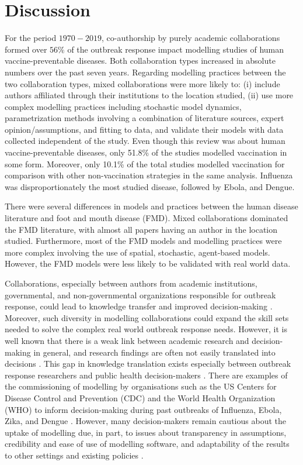 \documentclass[10pt,letterpaper]{article}
\begin{document}
\section*{Discussion}
For the period $1970-2019$, co-authorship by purely academic collaborations formed over $56\%$ of the outbreak response impact modelling studies of human vaccine-preventable diseases. Both collaboration types increased in absolute numbers over the past seven years. Regarding modelling practices between the two collaboration types, mixed collaborations were more likely to: (i) include authors affiliated through their institutions to the location studied, (ii) use more complex modelling practices including stochastic model dynamics, parametrization methods involving a combination of literature sources, expert opinion/assumptions, and fitting to data, and validate their models with data collected independent of the study. Even though this review was about human vaccine-preventable diseases, only 51.8\% of the studies modelled vaccination in some form. Moreover, only 10.1\% of the total studies modelled vaccination for comparison with other non-vaccination strategies in the same analysis. Influenza was disproportionately the most studied disease, followed by Ebola, and Dengue. 

There were several differences in models and practices between the human disease literature and foot and mouth disease (FMD). Mixed collaborations dominated the FMD literature, with almost all papers having an author in the location studied. Furthermore, most of the FMD models and modelling practices were more complex involving the use of spatial, stochastic, agent-based models. However, the FMD models were less likely to be validated with real world data.

Collaborations, especially between authors from academic institutions, governmental, and non-governmental organizations responsible for outbreak response, could lead to knowledge transfer and improved decision-making \cite{Muscatello2017}. Moreover, such diversity in modelling collaborations could expand the skill sets needed to solve the complex real world outbreak response needs. However, it is well known that there is a weak link between academic research and decision-making in general, and research findings are often not easily translated into decisions \cite{Choi2005,Deelstra2003,Muscatello2017}. This gap in knowledge translation exists especially between outbreak response researchers and public health decision-makers \cite{Rivers2019,Muscatello2017}. There are examples of the commissioning of modelling by organisations such as the US Centers for Disease Control and Prevention (CDC) and the World Health Organization (WHO) to inform decision-making during past outbreaks of Influenza, Ebola, Zika, and Dengue \cite{Muscatello2017}. However, many decision-makers remain cautious about the uptake of modelling due, in part, to issues about transparency in assumptions, credibility and ease of use of modelling software, and adaptability of the results to other settings and existing policies \cite{Muscatello2017}.
\end{document}
